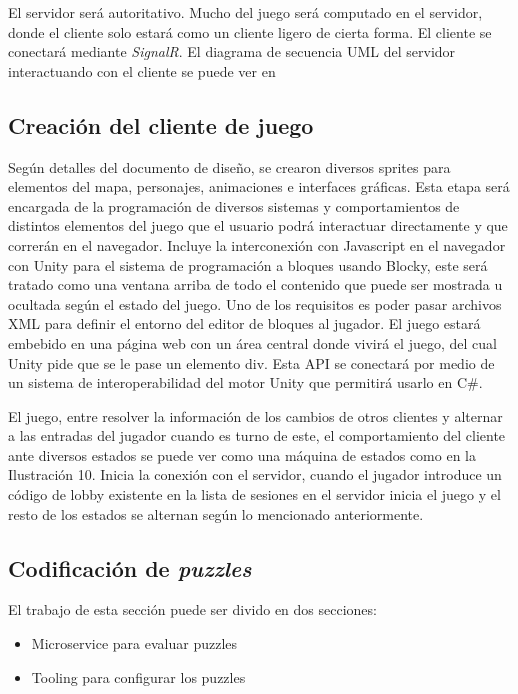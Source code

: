 El servidor será autoritativo. Mucho del juego será computado en el servidor, donde el cliente solo estará como un cliente ligero de cierta forma. 
El cliente se conectará mediante \textit{SignalR}.
El diagrama de secuencia UML del servidor interactuando con el cliente se puede ver en 

\subsection{Creación del cliente de juego}
Según detalles del documento de diseño, se crearon diversos sprites para elementos del mapa, personajes, animaciones e interfaces gráficas. Esta etapa será encargada de la programación de diversos sistemas y comportamientos de distintos elementos del juego que el usuario podrá interactuar directamente y que correrán en el navegador. Incluye la interconexión con Javascript en el navegador con Unity para el sistema de programación a bloques usando Blocky, este será tratado como una ventana arriba de todo el contenido que puede ser mostrada u ocultada según el estado del juego. Uno de los requisitos es poder pasar archivos XML para definir el entorno del editor de bloques al jugador.
El juego estará embebido en una página web con un área central donde vivirá el juego, del cual Unity pide que se le pase un elemento div. 
Esta API se conectará por medio de un sistema de interoperabilidad del motor Unity que permitirá usarlo en C\#.

El juego, entre resolver la información de los cambios de otros clientes y alternar a las entradas del jugador cuando es turno de este, el comportamiento del cliente ante diversos estados se puede ver como una máquina de estados como en la Ilustración 10. Inicia la conexión con el servidor, cuando el jugador introduce un código de lobby existente en la lista de sesiones en el servidor inicia el juego y el resto de los estados se alternan según lo mencionado anteriormente.

\subsection{Codificación de \textit{puzzles}}
El trabajo de esta sección puede ser divido en dos secciones:
\begin{itemize}
    \item Microservice para evaluar puzzles
    \item Tooling para configurar los puzzles
\end{itemize}

